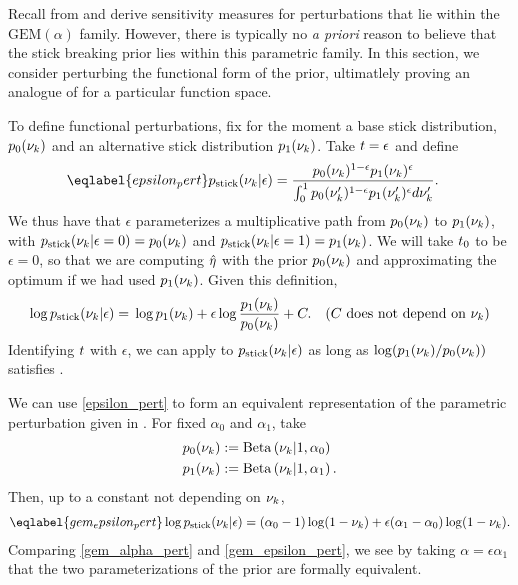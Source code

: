 Recall from  and  derive
sensitivity measures for perturbations that lie within the
$\mathrm{GEM}(\alpha)$ family.  However, there is typically no {\em a priori}
reason to believe that the stick breaking prior lies within this parametric
family.  In this section, we consider perturbing the functional form of the
prior, ultimatlely proving an analogue of  for a particular
function space.

To define functional perturbations, fix for the moment a base stick
distribution, $p_{0}(\nu_{k})$ and an alternative stick distribution $p_{1}(\nu_{k})$.
Take $t = \epsilon$ and define
%
\begin{align}\eqlabel{epsilon_pert}
%
\pstick(\nuk \vert \epsilon) ={}&
\frac{\pbase(\nuk)^{1 - \epsilon} \palt(\nuk)^\epsilon}
     {\int_0^1 \pbase(\nuk')^{1 - \epsilon} \palt(\nuk')^\epsilon d\nuk'}.
%
\end{align}
%
We thus have that $\epsilon$ parameterizes a multiplicative path from
$p_{0}(\nu_{k})$ to $p_{1}(\nu_{k})$, with $p_{\mathrm{stick}}(\nu_{k} \vert \epsilon = 0) = p_{0}(\nu_{k})$
and $p_{\mathrm{stick}}(\nu_{k} \vert \epsilon=1) = p_{1}(\nu_{k})$.  We will take
$t_0$ to be $\epsilon = 0$, so that we are computing $\hat\eta$ with the
prior $p_{0}(\nu_{k})$ and approximating the optimum if we had used $p_{1}(\nu_{k})$.
%
Given this definition,
%
\begin{align*}
%
\log \pstick(\nuk \vert \epsilon) ={}&
    \log \palt(\nuk) + \epsilon \log \frac{\palt(\nuk)}{\pbase(\nuk)} + \const.
    & \constdesc{\nuk}
%
\end{align*}
%
Identifying $t$ with $\epsilon$, we can apply  to
$p_{\mathrm{stick}}(\nu_{k} \vert \epsilon)$ as long as $\log (p_{1}(\nu_{k}) / p_{0}(\nu_{k}))$
satisfies .

\begin{ex}
%
We can use \eqref{epsilon_pert} to form an equivalent representation of the
parametric perturbation given in .  For fixed
$\alpha_0$ and $\alpha_1$, take
%
\begin{align*}
%
\pbase(\nuk) :={}& \betadist{\nuk \vert 1, \alpha_0}\\
\palt(\nuk) :={}& \betadist{\nuk \vert 1, \alpha_1}.
%
\end{align*}
%
Then, up to a constant not depending on $\nu_{k}$,
%
\begin{align}\eqlabel{gem_epsilon_pert}
%
\log \pstick(\nuk \vert \epsilon) =
    (\alpha_0 - 1) \log(1 - \nuk) +
    \epsilon  (\alpha_1 - \alpha_0) \log(1 - \nuk).
%
\end{align}
%
Comparing \eqref{gem_alpha_pert} and \eqref{gem_epsilon_pert}, we see by taking
$\alpha = \epsilon \alpha_1$ that the two parameterizations of the prior are
formally equivalent.
%
\end{ex}

